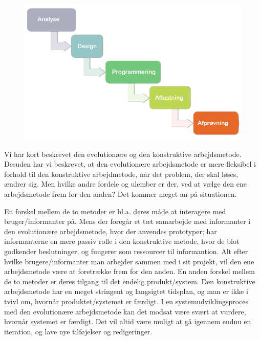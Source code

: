 \begin{figure}[ht]
	\centering
	\includegraphics[scale=0.5]{billeder/konstruktivemetode.png}
  	\label{fig:konstruktivemetode}
\end{figure}

Vi har kort beskrevet den evolutionære og den konstruktive arbejdsmetode. Desuden har vi beskrevet, at den evolutionære arbejdsmetode er mere fleksibel i forhold til den konstruktive arbejdmetode, når det problem, der skal løses, ændrer sig. Men hvilke andre fordele og ulember er der, ved at vælge den ene arbejdsmetode frem for den anden? Det kommer meget an på situationen.

En forskel mellem de to metoder er bl.a. deres måde at interagere med bruger/informanter på. Mens der foregår et tæt samarbejde med informanter i den evolutionære arbejdsmetode, hvor der anvendes prototyper; har informanterne en mere passiv rolle i den konstruktive metode, hvor de blot godkender beslutninger, og fungerer som ressourcer til informantion. Alt efter hvilke brugere/informanter man arbejder sammen med i sit projekt, vil den ene arbejdsmetode være at foretrække frem for den anden. En anden forskel mellem de to metoder er deres tilgang til det endelig produkt/system. Den konstruktive arbejdsmetode har en meget stringent og langsigtet tidsplan, og man er ikke i tvivl om, hvornår produktet/systemet er færdigt. I en systemudviklingsproces med den evolutionære arbejdsmetode kan det modsat være svært at vurdere,  hvornår systemet er færdigt. Det vil altid være muligt at gå igennem endnu en iteration, og lave nye tilføjelser og redigeringer.

